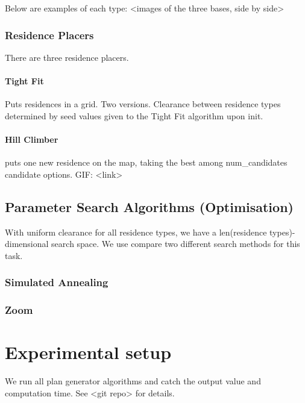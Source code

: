 \documentclass{article}
\begin{document}
Below are examples of each type: <images of the three bases, side by side>

\subsubsection{Residence Placers}

There are three residence placers.

\paragraph{Tight Fit}

Puts residences in a grid. Two versions. %
Clearance between residence types determined by seed values given to the Tight Fit algorithm upon init.


\paragraph{Hill Climber}

puts one new residence on the map, taking the best among num\_candidates candidate options. GIF: <link>

\subsection{Parameter Search Algorithms (Optimisation)}

With uniform clearance for all residence types, we have a len(residence types)-dimensional search space. We use compare two different search methods for this task.

\subsubsection{Simulated Annealing}

\subsubsection{Zoom}

\section{Experimental setup}

We run all plan generator algorithms and catch the output value and computation time. See <git repo> for details.
\end{document}
